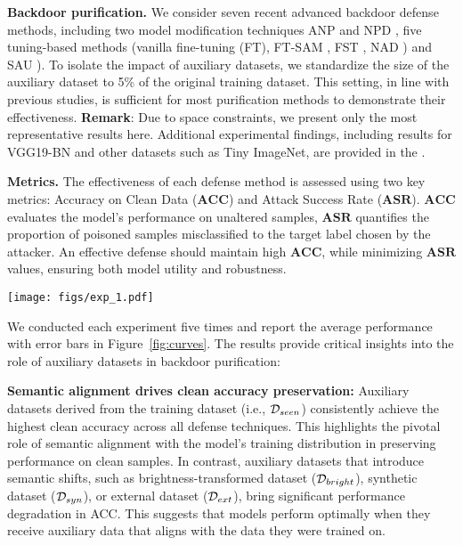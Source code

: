 \textbf{Backdoor purification.}
We consider seven recent advanced backdoor defense methods, including two model modification techniques ANP \cite{wu2021adversarial} and NPD \cite{zhu2023neural},  five tuning-based methods (vanilla fine-tuning (FT), FT-SAM \cite{Zhu_2023_ICCV}, FST \cite{min2024towards}, NAD \citep{li2021neural}) and SAU \citep{wei2024shared}). To isolate the impact of auxiliary datasets, we standardize the size of the auxiliary dataset to 5\% of the original training dataset. This setting, in line with previous studies, is sufficient for most purification methods to demonstrate their effectiveness. \textbf{Remark}: Due to space constraints, we present only the most representative results here. Additional experimental findings, including results for VGG19-BN and other datasets such as Tiny ImageNet, are provided in the \app.

\textbf{Metrics.}
The effectiveness of each defense method is assessed using two key metrics: Accuracy on Clean Data (\(\textbf{ACC}\)) and Attack Success Rate (\(\textbf{ASR}\)). \(\textbf{ACC}\) evaluates the model's performance on unaltered samples, \(\textbf{ASR}\) quantifies the proportion of poisoned samples misclassified to the target label chosen by the attacker. An effective defense should maintain high \(\textbf{ACC}\), while minimizing \(\textbf{ASR}\) values, ensuring both model utility and robustness.

\begin{figure*}[h]
    \centering
    \texttt{[image: figs/exp\_1.pdf]}
    \vspace{-0.3in}
    \caption{Performance of backdoor purification techniques equipped with different types of auxiliary dataset. Each experiment is run five times and the average value with error bar is reported. Results on more attacks and purification techniques are provided in \app.}
    \label{fig:curves}
    \vspace{-0.2in}
\end{figure*}

We conducted each experiment five times and report the average performance with error bars in Figure~\ref{fig:curves}. The results provide critical insights into the role of auxiliary datasets in backdoor purification:

 \textbf{Semantic alignment drives clean accuracy preservation:} Auxiliary datasets derived from the training dataset (i.e., $\mathcal{D}_{seen}$) consistently achieve the highest clean accuracy across all defense techniques. This highlights the pivotal role of semantic alignment with the model’s training distribution in preserving performance on clean samples. In contrast, auxiliary datasets that introduce semantic shifts, such as brightness-transformed dataset ($\mathcal{D}_{bright}$), synthetic dataset ($\mathcal{D}_{syn}$), or external dataset ($\mathcal{D}_{ext}$), bring significant performance degradation in ACC. This suggests that models perform optimally when they receive auxiliary data that aligns with the  data they were trained on.

